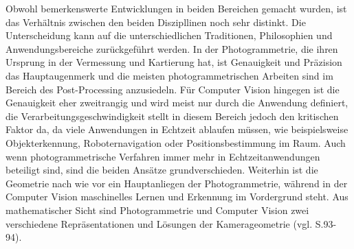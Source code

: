 Obwohl bemerkenswerte Entwicklungen in beiden Bereichen gemacht wurden, ist das Verhältnis zwischen den beiden Diszipllinen noch sehr distinkt. Die Unterscheidung kann auf die unterschiedlichen Traditionen, Philosophien und Anwendungsbereiche zurückgeführt werden. In der Photogrammetrie, die ihren Ursprung in der Vermessung und Kartierung hat, ist Genauigkeit und Präzision das Hauptaugenmerk und die meisten photogrammetrischen Arbeiten sind im Bereich des Post-Processing anzusiedeln. Für Computer Vision hingegen ist die Genauigkeit eher zweitrangig und wird meist nur durch die Anwendung definiert, die Verarbeitungsgeschwindigkeit stellt in diesem Bereich jedoch den kritischen Faktor da, da viele Anwendungen in Echtzeit ablaufen müssen, wie beispielsweise Objekterkennung, Roboternavigation oder Positionsbestimmung im Raum. Auch wenn photogrammetrische Verfahren immer mehr in Echtzeitanwendungen beteiligt sind, sind die beiden Ansätze grundverschieden. Weiterhin ist die Geometrie nach wie vor ein Hauptanliegen der Photogrammetrie, während in der Computer Vision maschinelles Lernen und Erkennung im Vordergrund steht. Aus mathematischer Sicht sind Photogrammetrie und Computer Vision zwei verschiedene Repräsentationen und Lösungen der Kamerageometrie (vgl. \cite{ph_vs_cv} S.93-94).


